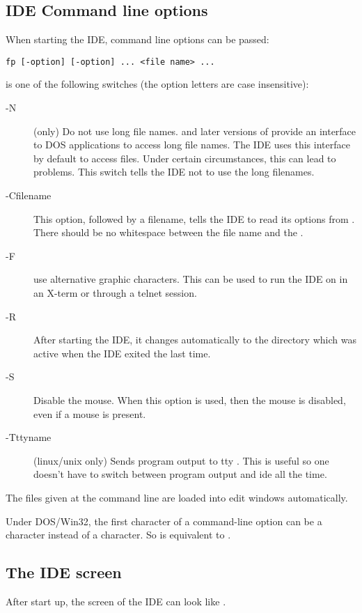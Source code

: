 \subsection{IDE Command line options}
When starting the IDE, command line options can be passed:
\begin{verbatim}
fp [-option] [-option] ... <file name> ...
\end{verbatim}
 is one of the following switches (the option letters
are case insensitive):
\begin{description}
\item [-N] (\dos only) Do not use long file names.  and later
versions of \windows provide an interface to DOS applications to access 
long file names. 
The IDE uses this interface by default to access files. Under certain 
circumstances, this can lead to problems. This switch tells the IDE not to
use the long filenames.
\item [-Cfilename] This option, followed by a filename, tells the IDE to
read its options from . There should be no whitespace between
the file name and the .
\item [-F] use alternative graphic characters. This can be used to run the
IDE on \linux in an X-term or through a telnet session.
\item [-R] After starting the IDE, it changes automatically to the directory
which was active when the IDE exited the last time.
\item [-S] Disable the mouse. When this option is used, then the mouse is
disabled, even if a mouse is present.
\item[-Tttyname] (linux/unix only) Sends program output to tty . 
This is useful so one doesn't have to switch between program output and ide
all the time.
\end{description}
The files given at the command line are loaded into edit windows automatically.

\begin{remark}
Under DOS/Win32, the first character of a command-line option can be a \var{/}
character instead of a \var{-} character. So  is equivalent to .
\end{remark}

\subsection{The IDE screen}

After start up, the screen of the IDE can look like .

